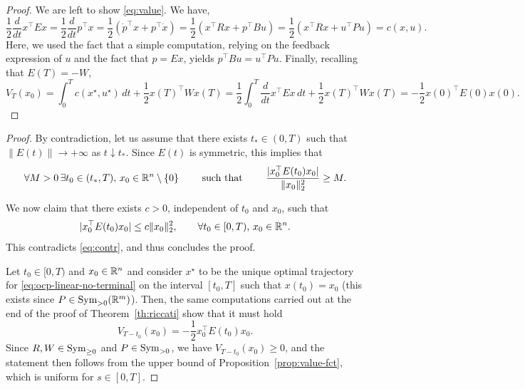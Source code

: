 \begin{proof}
    We are left to show \eqref{eq:value}. 
    We have,
    \begin{equation}
        \frac12\frac{d}{dt} x^\top E x 
        =\frac12\frac{d}{dt} p^\top x 
        = \frac12\left({\dot p}^\top x + p^\top \dot x\right)
        = \frac12\left(x^\top R x + p^\top B u\right)
        = \frac12\left(x^\top R x + u^\top P u \right)
        = c(x,u).
    \end{equation}
    Here, we used the fact that a simple computation, relying on the feedback expression of $u$ and the fact that $p=Ex$, yields $p^\top B u = u^\top Pu$.
    Finally, recalling that $E(T)=-W$,
    \begin{equation}
        V_T(x_0) =  \int_0^T c(x^\star,u^\star)\, dt + \frac12x(T)^\top W x(T) = \frac12\int_0^T \frac{d}{dt} x^\top E x\, dt+ \frac12x(T)^\top W x(T)
         = -\frac12x(0)^\top E(0) x(0).
    \end{equation}
\end{proof}


\begin{proof}
    By contradiction, let us assume that there exists $t_*\in (0,T)$ such that $\|E(t)\|\rightarrow +\infty$ as $t\downarrow t_*$. Since $E(t)$ is symmetric, this implies that
     \begin{equation}
         \label{eq:contr}
         \forall M>0 \, \exists t_0\in (t_*,T),\, x_0\in \mathbb{R}^n\setminus\{0\} \qquad \text{ such that }\qquad \frac{|x_0^\top E(t_0)x_0|}{\|x_0\|_2^2}\ge M.
     \end{equation}

     We now claim that there exists $c>0$, independent of $t_0$ and $x_0$, such that
     \begin{equation}
         |x_0^\top E(t_0)x_0|\le c \|x_0\|_2^2, \qquad \forall t_0\in [0,T),\, x_0\in\mathbb{R}^n.
     \end{equation}
     This contradicts \eqref{eq:contr}, and thus concludes the proof.
    
    Let $t_0\in [0,T)$ and $x_0\in \mathbb{R}^n$ and consider $x^\star$ to be the unique optimal trajectory for \eqref{eq:ocp-linear-no-terminal} on the interval $[t_0,T]$ such that $x(t_0)=x_0$ (this exists since $P\in \operatorname{Sym}_{>0}(\mathbb{R}^m)$). Then, the same computations carried out at the end of the proof of Theorem~\ref{th:riccati} show that it must hold
     \begin{equation}
         V_{T-t_0}(x_0)=-\frac12 x_0^\top E(t_0)x_0.
     \end{equation}
     Since $R,W\in\operatorname{Sym}_{\ge0}$ and $P\in\operatorname{Sym}_{>0}$, we have $V_{T-t_0}(x_0)\ge 0$, and the statement then follows from the upper bound of Proposition~\ref{prop:value-fct}, which is uniform for $s\in[0,T]$.
\end{proof}

